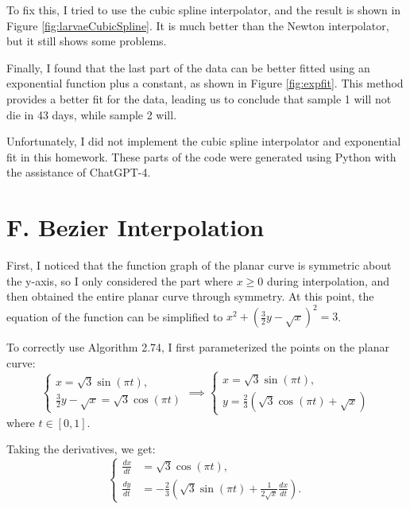\documentclass[a4paper]{article}
\begin{document}
To fix this, I tried to use the cubic spline interpolator, and the result is shown in Figure \ref{fig:larvaeCubicSpline}. It is much better than the Newton interpolator, but it still shows some problems.

Finally, I found that the last part of the data can be better fitted using an exponential function plus a constant, as shown in Figure \ref{fig:expfit}. This method provides a better fit for the data, leading us to conclude that sample 1 will not die in 43 days, while sample 2 will.

Unfortunately, I did not implement the cubic spline interpolator and exponential fit in this homework. These parts of the code were generated using Python with the assistance of ChatGPT-4.
\section{F. Bezier Interpolation}
First, I noticed that the function graph of the planar curve is symmetric about the y-axis, so I only considered the part where \( x \geq 0 \) during interpolation, and then obtained the entire planar curve through symmetry. At this point, the equation of the function can be simplified to \( x^2 + \left(\frac{3}{2}y - \sqrt{x}\right)^2 = 3 \).

To correctly use Algorithm 2.74, I first parameterized the points on the planar curve:
\[
\begin{cases}
  x = \sqrt{3} \sin(\pi t), \\
  \frac{3}{2}y - \sqrt{x} = \sqrt{3} \cos(\pi t)
\end{cases}
\implies
\begin{cases}
  x = \sqrt{3} \sin(\pi t), \\
  y = \frac{2}{3} \left( \sqrt{3} \cos(\pi t) + \sqrt{x} \right)
\end{cases}
\]
where \( t \in [0, 1] \).

Taking the derivatives, we get:
\[
\begin{cases}
  \frac{dx}{dt} &= \sqrt{3} \cos(\pi t), \\
  \frac{dy}{dt} &= -\frac{2}{3} \left( \sqrt{3} \sin(\pi t) + \frac{1}{2\sqrt{x}} \frac{dx}{dt} \right).
\end{cases}
\]
\end{document}
